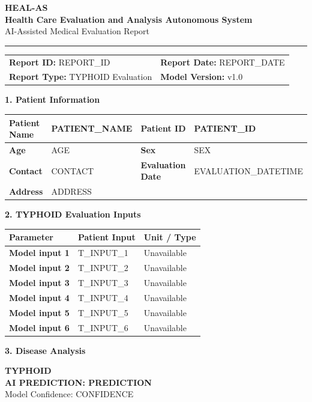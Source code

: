 \documentclass[11pt,a4paper]{article}
\newcommand{\sectiontitle}[1]{\vspace{8pt}\noindent\colorbox{HealBlue}{\parbox{\dimexpr\linewidth-2\fboxsep}{\color{white}\textbf{\large #1}}}\vspace{5pt}}
\begin{document}
\begin{center}
{\Huge\textbf{\color{HealBlue}HEAL-AS}}\\[3pt]
{\large\textbf{Health Care Evaluation and Analysis Autonomous System}}\\[3pt]
{\small AI-Assisted Medical Evaluation Report}\\[6pt]
\rule{\linewidth}{1pt}
\end{center}
\begin{tabularx}{\linewidth}{X X}
\textbf{Report ID:} {{REPORT_ID}} & \textbf{Report Date:} {{REPORT_DATE}}\\
\textbf{Report Type:} TYPHOID Evaluation & \textbf{Model Version:} v1.0
\end{tabularx}

\sectiontitle{1. Patient Information}
\begin{tabularx}{\linewidth}{|l|X|l|X|}
\hline
\textbf{Patient Name} & {{PATIENT_NAME}} & \textbf{Patient ID} & {{PATIENT_ID}} \\ \hline
\textbf{Age} & {{AGE}} & \textbf{Sex} & {{SEX}} \\ \hline
\textbf{Contact} & {{CONTACT}} & \textbf{Evaluation Date} & {{EVALUATION_DATETIME}} \\ \hline
\textbf{Address} & \multicolumn{3}{l|}{{ADDRESS}} \\ \hline
\end{tabularx}

\sectiontitle{2. TYPHOID Evaluation Inputs}
\begin{tabularx}{\linewidth}{|X|X|X|}
\hline
\textbf{Parameter} & \textbf{Patient Input} & \textbf{Unit / Type}\\ \hline
\textbf{Model input 1} & {{T_INPUT_1}} & Unavailable\\ \hline
\textbf{Model input 2} & {{T_INPUT_2}} & Unavailable\\ \hline
\textbf{Model input 3} & {{T_INPUT_3}} & Unavailable\\ \hline
\textbf{Model input 4} & {{T_INPUT_4}} & Unavailable\\ \hline
\textbf{Model input 5} & {{T_INPUT_5}} & Unavailable\\ \hline
\textbf{Model input 6} & {{T_INPUT_6}} & Unavailable\\ \hline
\end{tabularx}

\sectiontitle{3. Disease Analysis}
\begin{tcolorbox}[colback=HealLight,colframe=HealBlue,halign=center]
{\Large\textbf{TYPHOID}}\\[6pt]
{\Large\textbf{AI PREDICTION: {{PREDICTION}}}}\\[5pt]
Model Confidence: {{CONFIDENCE}}
\end{tcolorbox}
\end{document}
